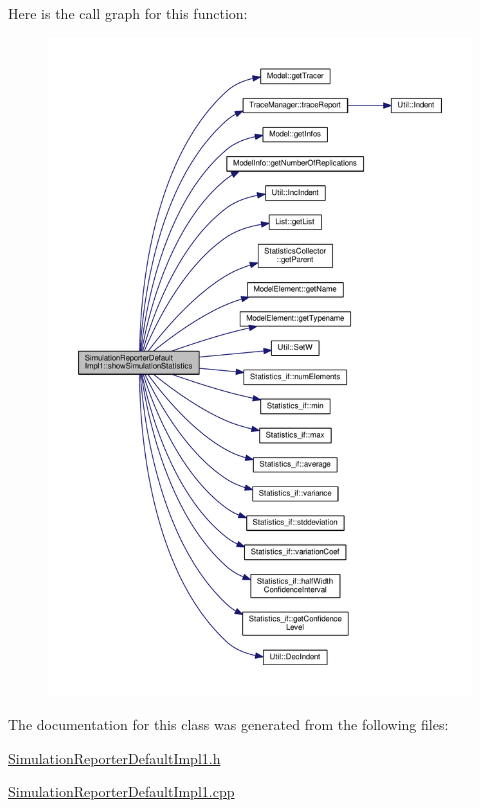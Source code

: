 Here is the call graph for this function\+:
\nopagebreak
\begin{figure}[H]
\begin{center}
\leavevmode
\includegraphics[width=350pt]{class_simulation_reporter_default_impl1_aa8d94c9912cbaeb276bb7b1569c9bcaf_cgraph}
\end{center}
\end{figure}




The documentation for this class was generated from the following files\+:\begin{DoxyCompactItemize}
\item 
\hyperlink{_simulation_reporter_default_impl1_8h}{Simulation\+Reporter\+Default\+Impl1.\+h}\item 
\hyperlink{_simulation_reporter_default_impl1_8cpp}{Simulation\+Reporter\+Default\+Impl1.\+cpp}\end{DoxyCompactItemize}
